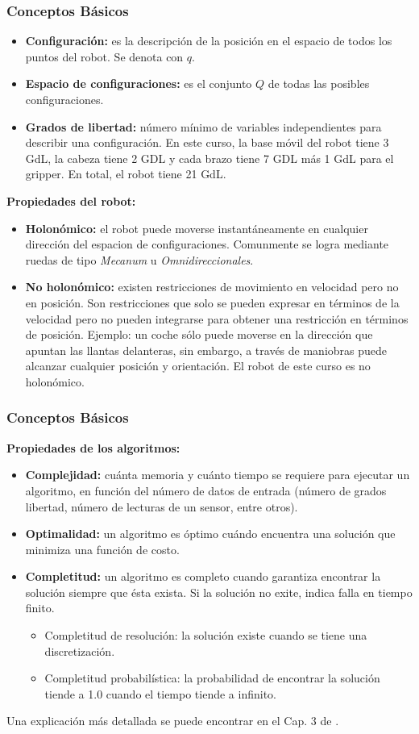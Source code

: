 \begin{frame}\frametitle{Conceptos Básicos}
  \begin{itemize}
  \item \textbf{Configuración:} es la descripción de la posición en el espacio de todos los puntos del robot. Se denota con $q$.
  \item \textbf{Espacio de configuraciones:} es el conjunto $Q$ de todas las posibles configuraciones. 
  \item \textbf{Grados de libertad:} número mínimo de variables independientes para describir una configuración. En este curso, la base móvil del robot tiene 3 GdL, la cabeza tiene 2 GDL y cada brazo tiene 7 GDL más 1 GdL para el gripper. En total, el robot tiene 21 GdL. 
  \end{itemize}
  \textbf{Propiedades del robot:}
  \begin{itemize}
  \item \textbf{Holonómico:} el robot puede moverse instantáneamente en cualquier dirección del espacion de configuraciones. Comunmente se logra mediante ruedas de tipo \textit{Mecanum} u \textit{Omnidireccionales}. 
  \item \textbf{No holonómico:} existen restricciones de movimiento en velocidad pero no en posición. Son restricciones que solo se pueden expresar en términos de la velocidad pero no pueden integrarse para obtener una restricción en términos de posición. Ejemplo: un coche sólo puede moverse en la dirección que apuntan las llantas delanteras, sin embargo, a través de maniobras puede alcanzar cualquier posición y orientación. El robot de este curso es no holonómico. 
  \end{itemize}
\end{frame}

\begin{frame}\frametitle{Conceptos Básicos}
  \textbf{Propiedades de los algoritmos:}
  \begin{itemize}
  \item \textbf{Complejidad:} cuánta memoria y cuánto tiempo se requiere para ejecutar un algoritmo, en función del número de datos de entrada (número de grados libertad, número de lecturas de un sensor, entre otros).
  \item \textbf{Optimalidad:} un algoritmo es óptimo cuándo encuentra una solución que minimiza una función de costo.
  \item \textbf{Completitud:} un algoritmo es completo cuando garantiza encontrar la solución siempre que ésta exista. Si la solución no exite, indica falla en tiempo finito.
    \begin{itemize}
    \item Completitud de resolución: la solución existe cuando se tiene una discretización. 
    \item Completitud probabilística: la probabilidad de encontrar la solución tiende a 1.0 cuando el tiempo tiende a infinito.
    \end{itemize}
  \end{itemize}
  Una explicación más detallada se puede encontrar en el Cap. 3 de \cite{choset2005principles}.
\end{frame}


